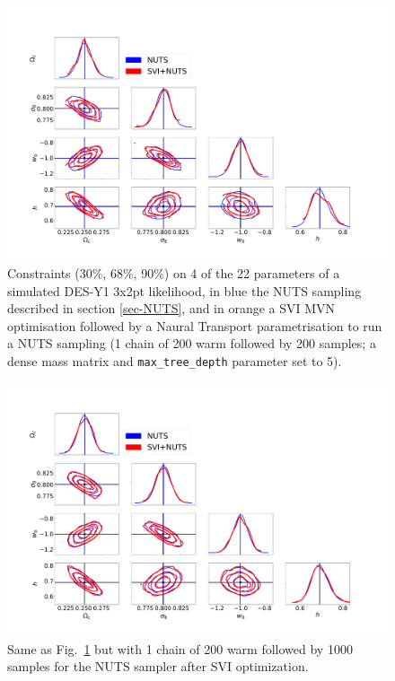 \documentclass[final,5p,times,twocolumn,authoryear]{elsarticle}
\begin{document}
\begin{figure}
\includegraphics[width=\columnwidth]{figures/SVI_NUTS_1x200x200.pdf}
\caption{Constraints (30\%, 68\%, 90\%) on 4 of the 22 parameters of a simulated DES-Y1 3x2pt likelihood, in blue the NUTS sampling described in section \ref{sec-NUTS}, and in orange a SVI MVN optimisation followed by a Naural Transport parametrisation to run a NUTS sampling (1 chain of 200 warm followed by 200 samples; a dense mass matrix and \texttt{max\_tree\_depth} parameter set to 5).}
\label{fig_svi_nuts_1}
\end{figure}

\begin{figure}
\includegraphics[width=\columnwidth]{figures/SVI_NUTS_1x200x1000.pdf}
\caption{Same as Fig.~\ref{fig_svi_nuts_1} but with 1 chain of 200 warm followed by 1000 samples for the NUTS sampler after SVI optimization.}
\label{fig_svi_nuts_2}
\end{figure}
\end{document}
